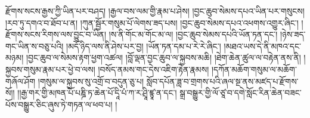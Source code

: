 རྫོགས་སངས་རྒྱས་ཀྱི་ཡིན་པར་བཤད། །རྒྱལ་བས་ལམ་གྱི་རྣམ་པ་ཤེས། །བྱང་ཆུབ་སེམས་དཔའ་ཡིན་པར་གསུངས། །རབ་ཏུ་དགའ་བ་ཐོབ་པ་ན། །ཀུན་སྦྱོར་གསུམ་པོ་ལེགས་ཟད་པས། །བྱང་ཆུབ་སེམས་དཔའ་འཕགས་འགྱུར་ཞིང་། །རྫོགས་སངས་རིགས་ལས་བྱུང་བ་ཡིན། །ས་ནི་གོང་མ་གོང་མ་ལ། །བྱང་ཆུབ་སེམས་དཔའི་ཡོན་ཏན་དང་། །ཉེས་ཟད་གང་ཡིན་ས་བཅུ་པའི། །མདོ་ཉིད་ལས་ནི་ཤེས་པར་བྱ། །ཡོན་ཏན་དམ་པ་རེ་རེ་ཞིང་། །མཐའ་ཡས་དེ་ནི་མཁའ་དང་མཉམ། །བྱང་ཆུབ་ལ་སེམས་རྟག་ཕྱག་འཚལ། །བློ་ལྡན་བྱང་ཆུབ་ལ་སྐྱབས་མཆི། །ཐེག་ཆེན་ཚུལ་ལ་བརྟེན་ནས་ནི། །སྐྱབས་གསུམ་རྣམ་པར་ཕྱེ་བ་ལས། །བསོད་ནམས་གང་དེས་འཇིག་རྟེན་རྣམས། །དཀོན་མཆོག་གསུམ་ལ་མཆོག་གཞོལ་ཤོག །གསུམ་ལ་སྐྱབས་སུ་འགྲོ་བ་བདུན་ཅུ་པ། སློབ་དཔོན་ཟླ་བ་གྲགས་པའི་ཞལ་སྔ་ནས་མཛད་པ་རྫོགས་སོ།། །།རྒྱ་གར་གྱི་མཁན་པོ་པཎྜི་ཏ་ཆེན་པོ་དཱི་པཾ་ཀ་ར་ཤྲཱི་ཛྙཱ་ན་དང་། སྒྲ་བསྒྱུར་གྱི་ལོ་ཙཱ་བ་དགེ་སློང་རིན་ཆེན་བཟང་པོས་བསྒྱུར་ཅིང་ཞུས་ཏེ་གཏན་ལ་ཕབ་པ། ། 